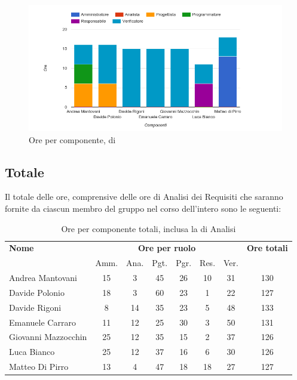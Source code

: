     \begin{figure}[H]
      \begin{center}
        \includegraphics[width=15cm]{res/img/suddivisioneRuoloProspettoOrario/orePerComponenteValidazione.png}
      \caption{Ore per componente,  di }
      \end{center} 
    \end{figure}    
   
    
    
\pagebreak
\subsection{Totale}
Il totale delle ore, comprensive delle ore di Analisi dei Requisiti che saranno fornite da ciascun membro
del gruppo nel corso dell’intero  sono le seguenti:

\begin{table}[H]
\begin{tabular}{lccccccc}
\toprule
    \textbf{Nome}  & \multicolumn{6}{c}{\textbf{Ore per ruolo}} & \textbf{Ore totali} \\
     & Amm. & Ana. & Pgt. & Pgr. & Res. & Ver. & \\
    \midrule
   
	   Andrea Mantovani & 15 & 3 & 45 & 26 & 10 & 31 & 130 \\
	     Davide Polonio & 18 & 3 & 60 & 23 & 1 & 22 & 127 \\
	      Davide Rigoni & 8 & 14 & 35 & 23 & 5 & 48 & 133 \\
	   Emanuele Carraro & 11 & 12 & 25 & 30 & 3 & 50 & 131 \\
	Giovanni Mazzocchin & 25 & 12 & 35 & 15 & 2 & 37 & 126 \\ 
	        Luca Bianco & 25 & 12 & 37 & 16 & 6 & 30 & 126 \\ 
	    Matteo Di Pirro & 13 & 4 & 47 & 18 & 18 & 27 & 127 \\ 
   
    \bottomrule
\end{tabular}
\caption{Ore per componente totali, inclusa la  di Analisi}
\end{table}

